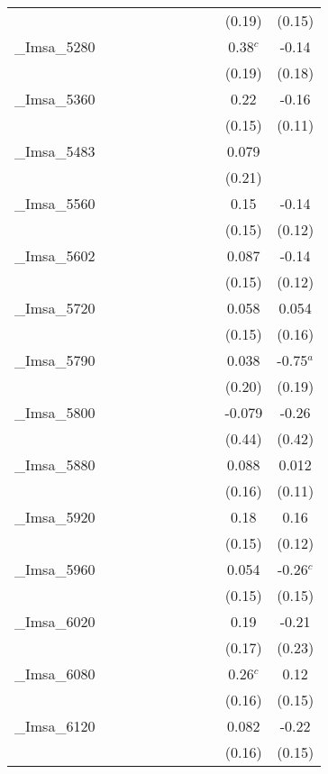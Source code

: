 \documentclass[]{article}
\begin{document}
\begin{tabular}{lcccccccccc}
 &  &  &  &  &  &  &  &  & (0.19) & (0.15) \\
\_Imsa\_5280 &  &  &  &  &  &  &  &  & 0.38$^c$ & -0.14 \\
 &  &  &  &  &  &  &  &  & (0.19) & (0.18) \\
\_Imsa\_5360 &  &  &  &  &  &  &  &  & 0.22 & -0.16 \\
 &  &  &  &  &  &  &  &  & (0.15) & (0.11) \\
\_Imsa\_5483 &  &  &  &  &  &  &  &  & 0.079 &  \\
 &  &  &  &  &  &  &  &  & (0.21) &  \\
\_Imsa\_5560 &  &  &  &  &  &  &  &  & 0.15 & -0.14 \\
 &  &  &  &  &  &  &  &  & (0.15) & (0.12) \\
\_Imsa\_5602 &  &  &  &  &  &  &  &  & 0.087 & -0.14 \\
 &  &  &  &  &  &  &  &  & (0.15) & (0.12) \\
\_Imsa\_5720 &  &  &  &  &  &  &  &  & 0.058 & 0.054 \\
 &  &  &  &  &  &  &  &  & (0.15) & (0.16) \\
\_Imsa\_5790 &  &  &  &  &  &  &  &  & 0.038 & -0.75$^a$ \\
 &  &  &  &  &  &  &  &  & (0.20) & (0.19) \\
\_Imsa\_5800 &  &  &  &  &  &  &  &  & -0.079 & -0.26 \\
 &  &  &  &  &  &  &  &  & (0.44) & (0.42) \\
\_Imsa\_5880 &  &  &  &  &  &  &  &  & 0.088 & 0.012 \\
 &  &  &  &  &  &  &  &  & (0.16) & (0.11) \\
\_Imsa\_5920 &  &  &  &  &  &  &  &  & 0.18 & 0.16 \\
 &  &  &  &  &  &  &  &  & (0.15) & (0.12) \\
\_Imsa\_5960 &  &  &  &  &  &  &  &  & 0.054 & -0.26$^c$ \\
 &  &  &  &  &  &  &  &  & (0.15) & (0.15) \\
\_Imsa\_6020 &  &  &  &  &  &  &  &  & 0.19 & -0.21 \\
 &  &  &  &  &  &  &  &  & (0.17) & (0.23) \\
\_Imsa\_6080 &  &  &  &  &  &  &  &  & 0.26$^c$ & 0.12 \\
 &  &  &  &  &  &  &  &  & (0.16) & (0.15) \\
\_Imsa\_6120 &  &  &  &  &  &  &  &  & 0.082 & -0.22 \\
 &  &  &  &  &  &  &  &  & (0.16) & (0.15) \\

\end{tabular}
\end{document}
